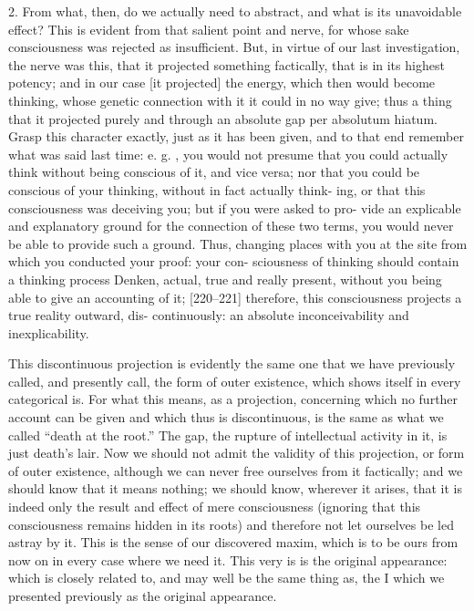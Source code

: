 2. From what, then, do we actually need to abstract, and what is its
unavoidable effect? This is evident from that salient point and nerve, for
whose sake consciousness was rejected as insufficient.
But, in virtue of our last
investigation, the nerve was this, that it projected something factically, that is
in its highest potency; and in our case [it projected] the energy, which then
would become thinking, whose genetic connection with it it could in no way
give; thus a thing that it projected purely and through an absolute gap {per
absolutum hiatum}.
Grasp this character exactly, just as it has been given, and
to that end remember what was said last time: e.
g.
, you would not presume
that you could actually think without being conscious of it, and vice versa; nor
that you could be conscious of your thinking, without in fact actually think-
ing, or that this consciousness was deceiving you; but if you were asked to pro-
vide an explicable and explanatory ground for the connection of these two
terms, you would never be able to provide such a ground.
Thus, changing
places with you at the site from which you conducted your proof: your con-
sciousness of thinking should contain a thinking process {Denken}, actual, true
and really present, without you being able to give an accounting of it;
[220–221] therefore, this consciousness projects a true reality outward, dis-
continuously: an absolute inconceivability and inexplicability.

This discontinuous projection is evidently
the same one that we have previously called,
and presently call, the form of outer existence,
which shows itself in every categorical is.
For what this means, as a projection,
concerning which no further account can be given
and which thus is discontinuous,
is the same as what we called “death at the root.”
The gap, the rupture of intellectual activity in it,
is just death’s lair.
Now we should not admit the validity of this projection,
or form of outer existence,
although we can never free ourselves from it factically;
and we should know that it means nothing;
we should know, wherever it arises,
that it is indeed only the result
and effect of mere consciousness
(ignoring that this consciousness
remains hidden in its roots)
and therefore not let ourselves
be led astray by it.
This is the sense of our discovered maxim,
which is to be ours from now on in every case
where we need it.
This very is is the original appearance:
which is closely related to,
and may well be the same thing as,
the I which we presented previously
as the original appearance.

